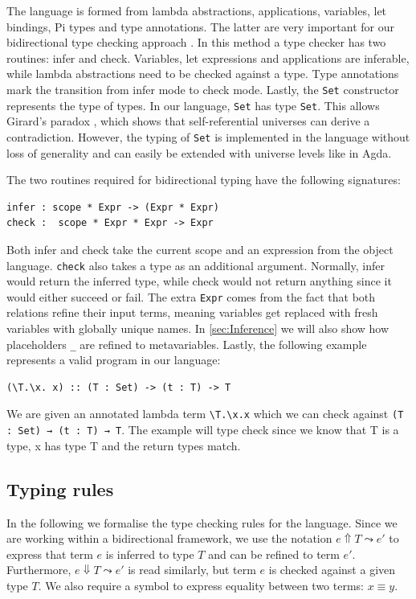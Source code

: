 \noindent The language is formed from lambda abstractions, applications, variables, let bindings, Pi types and type annotations. The latter are very important for our bidirectional type checking approach \autocite{dunfield2022bidirectional}. In this method a type checker has two routines: infer and check. Variables, let expressions and applications are inferable, while lambda abstractions need to be checked against a type. Type annotations mark the transition from infer mode to check mode. Lastly, the \texttt{Set} constructor represents the type of types. In our language, \texttt{Set} has type \texttt{Set}. This allows Girard's paradox \autocite{hurkens1995simplification}, which shows that self-referential universes can derive a contradiction. However, the typing of \texttt{Set} is implemented in the language without loss of generality and can easily be extended with universe levels like in Agda. \par
The two routines required for bidirectional typing have the following signatures:
\begin{lstlisting}[language=Statix]
infer : scope * Expr -> (Expr * Expr)
check :  scope * Expr * Expr -> Expr
\end{lstlisting}
Both infer and check take the current scope and an expression from the object language. \texttt{check} also takes a type as an additional argument. Normally, infer would return the inferred type, while check would not return anything since it would either succeed or fail. The extra \texttt{Expr} comes from the fact that both relations refine their input terms, meaning variables get replaced with fresh variables with globally unique names. In \cref{sec:Inference} we will also show how placeholders \texttt{\_} are refined to metavariables. Lastly, the following example represents a valid program in our language:
\begin{lstlisting}
(\T.\x. x) :: (T : Set) -> (t : T) -> T
\end{lstlisting}
We are given an annotated lambda term \texttt{\textbackslash T.\textbackslash x.x} which we can check against \texttt{(T : Set) → (t : T) → T}. The example will type check since we know that T is a type, x has type T and the return types match.

\subsection{Typing rules} In the following we formalise the type checking rules for the language. Since we are working within a bidirectional framework, we use the notation $e \Uparrow T \leadsto e'$ to express that term $e$ is inferred to type $T$ and can be refined to term $e'$. Furthermore, $e \Downarrow T \leadsto e'$ is read similarly, but term $e$ is checked against a given type $T$. We also require a symbol to express equality between two terms: $x \equiv y$.


